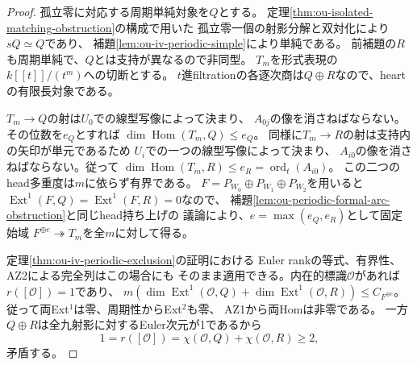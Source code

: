\begin{proof}
孤立零に対応する周期単純対象を$Q$とする。
定理\ref{thm:ou-isolated-matching-obstruction}の構成で用いた
孤立零一個の射影分解と双対化により$sQ\simeq Q$であり、
補題\ref{lem:ou-iv-periodic-simple}により単純である。
前補題の$R$も周期単純で、$Q$とは支持が異なるので非同型。
$T_m$を形式表現の$k[[t]]/(t^m)$への切断とする。
$t$進filtrationの各逐次商は$Q\oplus R$なので、heartの有限長対象である。

$T_m\to Q$の射は$U_0$での線型写像によって決まり、
$A_{0j}$の像を消さねばならない。その位数を$e_Q$とすれば
$\dim\operatorname{Hom}(T_m,Q)\leq e_Q$。
同様に$T_m\to R$の射は支持内の矢印が単元であるため
$U_i$での一つの線型写像によって決まり、
$A_{i0}$の像を消さねばならない。従って
$\dim\operatorname{Hom}(T_m,R)\leq e_R=\operatorname{ord}_t(A_{i0})$。
この二つのhead多重度は$m$に依らず有界である。
$F=P_{W_0}\oplus P_{W_1}\oplus P_{W_2}$を用いると
$\operatorname{Ext}^1(F,Q)=\operatorname{Ext}^1(F,R)=0$なので、
補題\ref{lem:ou-periodic-formal-arc-obstruction}と同じhead持ち上げの
議論により、$e=\max(e_Q,e_R)$として固定始域
$F^{\oplus e}\twoheadrightarrow T_m$を全$m$に対して得る。

定理\ref{thm:ou-iv-periodic-exclusion}の証明における
Euler rankの等式、有界性、AZ2による完全列はこの場合にも
そのまま適用できる。内在的標識$\mathcal O$があれば
$r([\mathcal O])=1$であり、
$m(\dim\operatorname{Ext}^1(\mathcal O,Q)+
\dim\operatorname{Ext}^1(\mathcal O,R))\leq C_{F^{\oplus e}}$。
従って両Ext$^1$は零、周期性からExt$^2$も零、
AZ1から両Homは非零である。
一方$Q\oplus R$は全九射影に対するEuler次元が1であるから
\[
 1=r([\mathcal O])=\chi(\mathcal O,Q)+\chi(\mathcal O,R)\geq2,
\]
矛盾する。
\end{proof}


